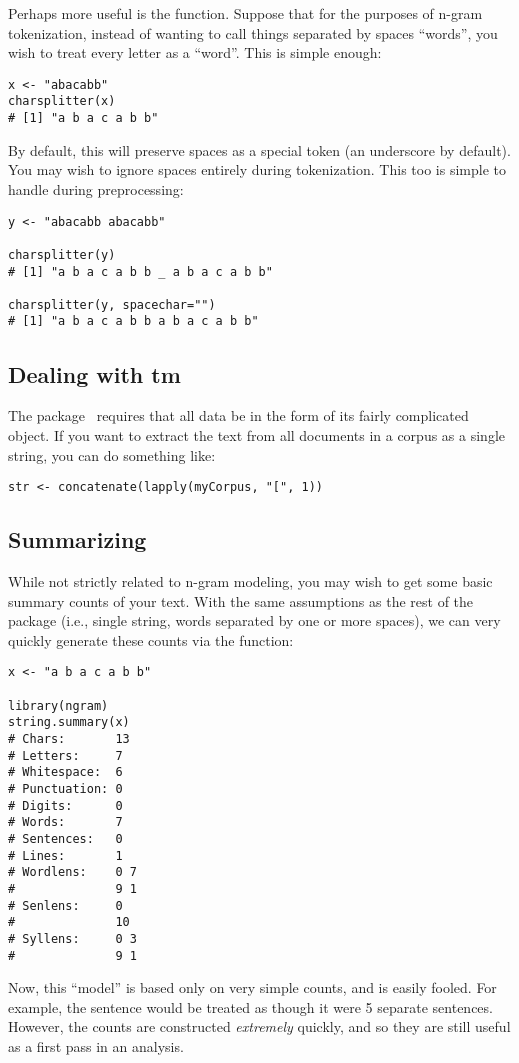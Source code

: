 Perhaps more useful is the  function.  Suppose that for the purposes of n-gram tokenization, instead of wanting to call things separated by spaces ``words'', you wish to treat every letter as a ``word''.  This is simple enough:
\begin{lstlisting}[language=rr]
x <- "abacabb"
charsplitter(x)
# [1] "a b a c a b b"
\end{lstlisting}
By default, this will preserve spaces as a special token (an underscore by default).  You may wish to ignore
spaces entirely during tokenization.  This too is simple to handle during preprocessing:
\begin{lstlisting}[language=rr]
y <- "abacabb abacabb"

charsplitter(y)
# [1] "a b a c a b b _ a b a c a b b"

charsplitter(y, spacechar="")
# [1] "a b a c a b b a b a c a b b"
\end{lstlisting}




\subsection{Dealing with tm}

The  package~\citep{tm} requires that all data be in the form of its fairly complicated  object.
If you want to extract the text from all documents in a corpus as a single string, you can do something like:
\begin{lstlisting}[language=rr]
str <- concatenate(lapply(myCorpus, "[", 1))   
\end{lstlisting}




\subsection{Summarizing}

While not strictly related to n-gram modeling, you may wish to get some basic summary counts of your text.  With
the same assumptions as the rest of the  package (i.e., single string, words separated by one or more
spaces), we can very quickly generate these counts via the  function:
\begin{lstlisting}[language=rr]
x <- "a b a c a b b"
 
library(ngram)
string.summary(x)
# Chars:       13
# Letters:     7
# Whitespace:  6
# Punctuation: 0
# Digits:      0
# Words:       7
# Sentences:   0
# Lines:       1 
# Wordlens:    0 7 
#              9 1 
# Senlens:     0 
#              10 
# Syllens:     0 3 
#              9 1 
\end{lstlisting}
Now, this ``model'' is based only on very simple counts, and is easily fooled.  For example, the sentence   would be treated as though it were 5 separate sentences.  However, the counts are constructed \emph{extremely} quickly, and so they are still useful as a first pass in an analysis. 
